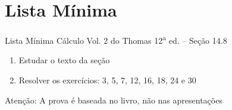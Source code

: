 \documentclass[fleqn,utf8,aspectratio=169,12pt,ignorenonframetext]{beamer}
\begin{document}






\section{Lista Mínima}

\begin{frame}{Lista Mínima}
  Cálculo Vol. 2 do Thomas 12\textsuperscript{a} ed. -- Seção 14.8
  \begin{enumerate}
    \item Estudar o texto da seção
    \item Resolver os exercícios: 3, 5, 7, 12, 16, 18, 24 e 30
  \end{enumerate}

  \vfill
  Atenção: A prova é baseada no livro, não nas apresentações
\end{frame}

\end{document}
